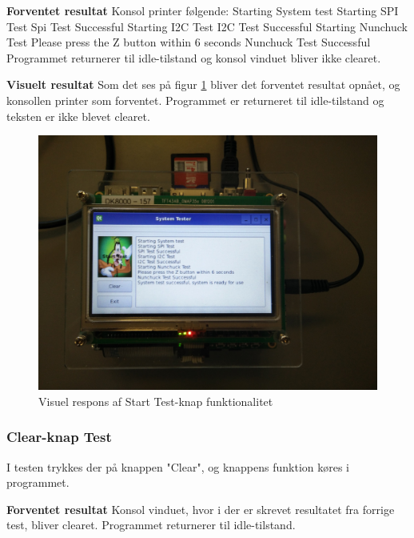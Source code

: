 \noindent\textbf{Forventet resultat}\newline
\noindent Konsol printer følgende:\newline
Starting System test\newline
Starting SPI Test\newline
Spi Test Successful\newline
Starting I2C Test\newline
I2C Test Successful\newline
Starting Nunchuck Test\newline
Please press the Z button within 6 seconds\newline
Nunchuck Test Successful
\noindent Programmet returnerer til idle-tilstand og konsol vinduet bliver ikke clearet.\newline

\noindent\textbf{Visuelt resultat}\newline
Som det ses på figur \ref{fig:GUIPrint} bliver det forventet resultat opnået, og konsollen printer som forventet.
Programmet er returneret til idle-tilstand og teksten er ikke blevet clearet. 

\begin{figure}[H]
	\centering
	\includegraphics[width=.5\textwidth]{Test/images/GUITest/TestPrint.jpg}
	\caption{Visuel respons af Start Test-knap funktionalitet}
	\label{fig:GUIPrint}
\end{figure}

\subsubsection{Clear-knap Test}
I testen trykkes der på knappen "Clear", og knappens funktion køres i programmet.\newline

\noindent\textbf{Forventet resultat}\newline
Konsol vinduet, hvor i der er skrevet resultatet fra forrige test, bliver clearet. Programmet returnerer til idle-tilstand.\newline

